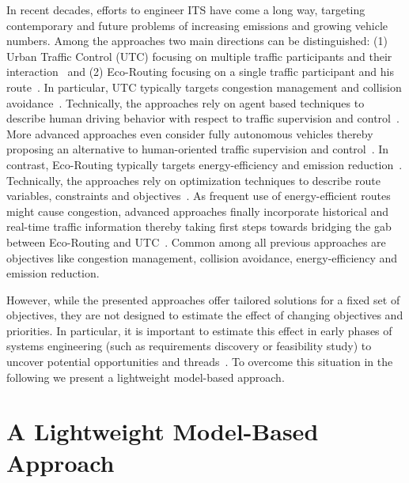 \documentclass[conference]{../cls/IEEEtran}
\begin{document}
In recent decades, efforts to engineer ITS have come a long way, targeting contemporary and future problems of increasing emissions and growing vehicle numbers. Among the approaches two main directions can be distinguished: (1) Urban Traffic Control (UTC) focusing on multiple traffic participants and their interaction~\cite{Chen2010,Dresner2008} and (2) Eco-Routing focusing on a single traffic participant and his route~\cite{Ericsson2006, Barth2007,Boriboonsomsin2012}. In particular, UTC typically targets congestion management and collision avoidance~\cite{Chen2010}. Technically, the approaches rely on agent based techniques to describe human driving behavior with respect to traffic supervision and control~\cite{Chen2010}. More advanced approaches even consider fully autonomous vehicles thereby proposing an alternative to human-oriented traffic supervision and control~\cite{Dresner2008}. In contrast, Eco-Routing typically targets energy-efficiency and emission reduction~\cite{Ericsson2006,Barth2007}. Technically, the approaches rely on optimization techniques to describe route variables, constraints and objectives~\cite{Ericsson2006,Barth2007}. As frequent use of energy-efficient routes might cause congestion, advanced approaches finally incorporate historical and real-time traffic information thereby taking first steps towards bridging the gab between Eco-Routing and UTC~\cite{Boriboonsomsin2012}. Common among all previous approaches are objectives like congestion management, collision avoidance, energy-efficiency and emission reduction.

However, while the presented approaches offer tailored solutions for a fixed set of objectives, they are not designed to estimate the effect of changing objectives and priorities. In particular, it is important to estimate this effect in early phases of systems engineering (such as requirements discovery or feasibility study) to uncover potential opportunities and threads~\cite{Whitten2005}. To overcome this situation in the following we present a lightweight model-based approach.

\section{A Lightweight Model-Based Approach}
\label{sec:approach}
\end{document}
